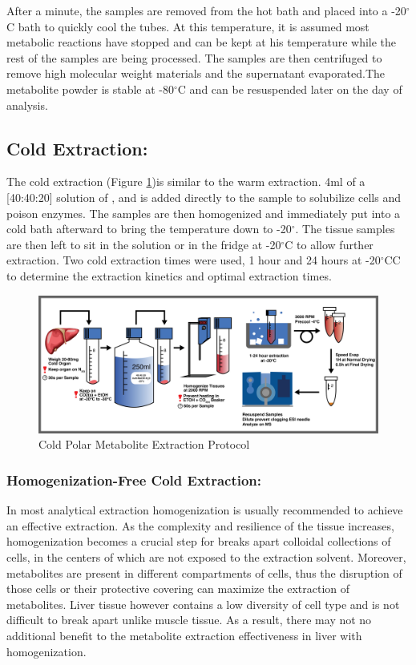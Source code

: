 \documentclass[a4paper]{book}
\begin{document}
	After a minute, the samples are removed from the hot bath and placed into a -20$^{\circ}$C bath to quickly cool the tubes. At this temperature, it is assumed most metabolic reactions have stopped and can be kept at his temperature while the rest of the samples are being processed. The samples are then centrifuged to remove high molecular weight materials and the supernatant evaporated.The metabolite powder is stable at -80$^\circ$C and can be resuspended later on the day of analysis.
	
	\subsection*{Cold Extraction:}
		
	The cold extraction (Figure \ref{fig:Cold Extraction Protocol})is similar to the warm extraction. 4ml of a [40:40:20] solution of ,  and  is added directly to the sample to solubilize cells and poison enzymes. The samples are then homogenized and immediately put into a cold bath afterward to bring the temperature down to -20$^\circ$. The tissue samples are then left to sit in the solution or in the fridge at -20$^{\circ}$C to allow further extraction. Two cold extraction times were used, 1 hour and 24 hours at -20$^{\circ}$CC to determine the extraction kinetics and optimal extraction times. 
		
	\begin{figure}
		\centering
		\includegraphics[width=\linewidth]{2.Optimizaiton_Figures/Metab-Cold-Proto-MH-20170120}
		\caption{Cold Polar Metabolite Extraction Protocol}
		\label{fig:Cold Extraction Protocol}
	\end{figure}
		
	\subsubsection*{Homogenization-Free Cold Extraction:}
	
	In most analytical extraction homogenization is usually recommended to achieve an effective extraction\citep{Mushtaq2014ExtractionMetabolome}. As the complexity and resilience of the tissue increases, homogenization becomes a crucial step for breaks apart colloidal collections of cells, in the centers of which are not exposed to the extraction solvent. Moreover, metabolites are present in different compartments of cells, thus the disruption of those cells or their protective covering can maximize the extraction of metabolites. Liver tissue however contains a low diversity of cell type and is not difficult to break apart unlike muscle tissue. As a result, there may not no additional benefit to the metabolite extraction effectiveness in liver with homogenization.
		
\end{document}
